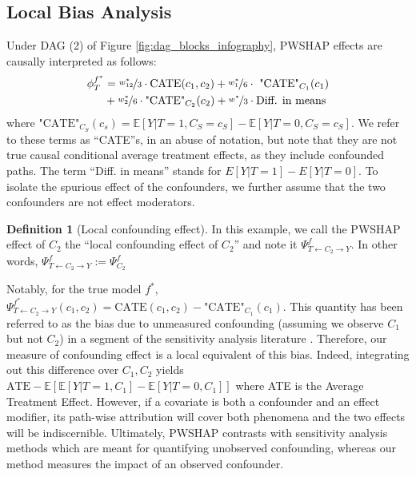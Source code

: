 \documentclass{article}
\theoremstyle{plain}
\theoremstyle{definition}
\newtheorem{definition}[theorem]{Definition}
\theoremstyle{remark}
\newcommand{\effect}{\Psi}
\theoremstyle{mystyle}
\begin{document}


\subsection{Local Bias Analysis} \label{sec:local_bias}
Under DAG (2) of Figure \ref{fig:dag_blocks_infography}, PWSHAP effects are causally interpreted as follows:
\begin{align*}
\phi_T^{f^*} &= \nicefrac{w^*_{12}}{3} \cdot \text{CATE}(c_1,c_2) + \nicefrac{w^*_1}{6} \cdot \text{ "CATE"}_{C_1}(c_1) \\
&+ \nicefrac{w^*_2}{6} \cdot \text{"CATE"}_{C_2}(c_2) + \nicefrac{w^*}{3} \cdot \text{Diff. in means}
\end{align*}
where $\text{"CATE"}_{C_S}(c_s) = \mathbb{E}[Y|T=1,C_S=c_S] - \mathbb{E}[Y|T=0,C_S=c_S]$.  We refer to these terms as ``CATE''s, in an abuse of notation, but note that they are not true causal conditional average treatment effects, as they include confounded paths. The term ``Diff. in means'' stands for  $E[Y|T=1]-E[Y|T=0]$. To isolate the spurious effect of the confounders, we further assume that the two confounders are not effect moderators.
\begin{definition}[Local confounding effect] \label{def:local_confounding_effect} In this example, we call the PWSHAP effect of $C_2$ the ``local confounding effect of $C_2$'' and note it $\effect^f_{T \leftarrow C_2 \rightarrow Y}$. In other words, $\effect^f_{T \leftarrow C_2 \rightarrow Y} := \effect^f_{C_2}$
\end{definition}
Notably, for the true model $f^*$, $\effect^{f^*}_{T \leftarrow C_2 \rightarrow Y}(c_1,c_2) = \text{CATE}(c_1,c_2) - \text{"CATE"}_{C_1}(c_1)$. This quantity has been referred to as the bias due to unmeasured confounding (assuming we observe $C_1$ but not $C_2$) in a segment of the sensitivity analysis literature . Therefore, our measure of confounding effect is a local equivalent of this bias. Indeed, integrating out this difference over $C_1,C_2$ yields $\text{ATE} - \mathbb{E}[\mathbb{E}[Y|T=1,C_1] - \mathbb{E}[Y|T=0,C_1]]$
where ATE is the Average Treatment Effect. However, if a covariate is both a confounder and an effect modifier, its path-wise attribution will cover both phenomena and the two effects will be indiscernible. Ultimately, PWSHAP contrasts with sensitivity analysis methods which are meant for quantifying unobserved confounding, whereas our method measures the impact of an observed confounder. %
\end{document}
